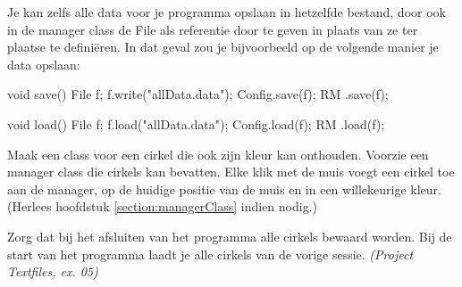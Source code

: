 Je kan zelfs alle data voor je programma opslaan in hetzelfde bestand, door ook in de manager class de File als referentie door te geven in plaats van ze ter plaatse te defini\"eren. In dat geval zou je bijvoorbeeld op de volgende manier je data opslaan:

\begin{code}
void save() {
  File f;
	f.write("allData.data");
	Config.save(f);
	RM    .save(f);
}

void load() {
	File f;
	f.load("allData.data");
	Config.load(f);
	RM    .load(f);
}
\end{code}

\begin{exercise}
Maak een class voor een cirkel die ook zijn kleur kan onthouden. Voorzie een manager class die cirkels kan bevatten. Elke klik met de muis voegt een cirkel toe aan de manager, op de huidige positie van de muis en in een willekeurige kleur. (Herlees hoofdstuk \ref{section:managerClass} indien nodig.)

Zorg dat bij het afsluiten van het programma alle cirkels bewaard worden. Bij de start van het programma laadt je alle cirkels van de vorige sessie. \textsl{(Project Textfiles, ex. 05)}
\end{exercise}


